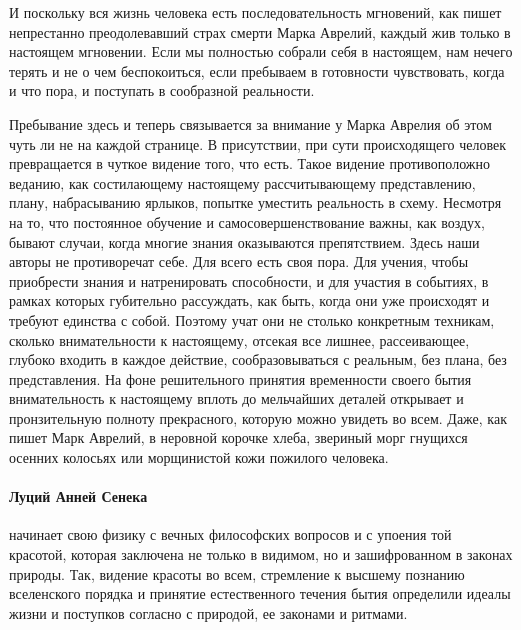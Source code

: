 И поскольку вся жизнь человека есть последовательность мгновений, как пишет
непрестанно преодолевавший страх смерти Марка Аврелий, каждый жив только в
настоящем мгновении. Если мы полностью собрали себя в настоящем, нам нечего
терять и не о чем беспокоиться, если пребываем в готовности чувствовать, когда и
что пора, и поступать в сообразной реальности. 

Пребывание здесь и теперь
связывается за внимание у Марка Аврелия об этом чуть ли не на каждой странице. В
присутствии, при сути происходящего человек превращается в чуткое видение того,
что есть. Такое видение противоположно веданию, как состилающему настоящему
рассчитывающему представлению, плану, набрасыванию ярлыков, попытке уместить
реальность в схему. Несмотря на то, что постоянное обучение и
самосовершенствование важны, как воздух, бывают случаи, когда многие знания
оказываются препятствием. Здесь наши авторы не противоречат себе. Для всего есть
своя пора. Для учения, чтобы приобрести знания и натренировать способности, и
для участия в событиях, в рамках которых губительно рассуждать, как быть, когда
они уже происходят и требуют единства с собой. Поэтому учат они не столько
конкретным техникам, сколько внимательности к настоящему, отсекая все лишнее,
рассеивающее, глубоко входить в каждое действие, сообразовываться с реальным,
без плана, без представления. На фоне решительного принятия временности своего
бытия внимательность к настоящему вплоть до мельчайших деталей открывает и
пронзительную полноту прекрасного, которую можно увидеть во всем. Даже, как
пишет Марк Аврелий, в неровной корочке хлеба, звериный морг гнущихся осенних
колосьях или морщинистой кожи пожилого человека. 

\paragraph{Луций Анней Сенека} начинает свою физику с вечных философских вопросов и с упоения той красотой, которая заключена не
только в видимом, но и зашифрованном в законах природы. Так, видение красоты во всем, стремление к высшему познанию вселенского порядка и принятие естественного течения бытия определили идеалы жизни и поступков согласно с природой, ее законами и ритмами. 

